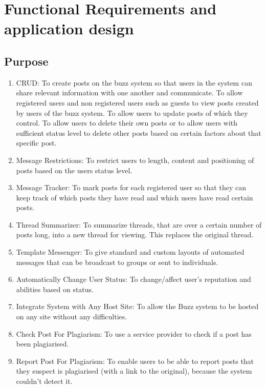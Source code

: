 \documentclass[12pt, oneside]{article}
\begin{document}
\section{Functional Requirements and application design}

\subsection{Purpose}
\begin{enumerate}
 \item{CRUD}: To create posts on the buzz system so that users in the system can share relevant information with one another and communicate. To allow registered users and non registered users such as guests to view posts created by users of the buzz system. To allow users to update posts of which they control. To allow users to delete their own posts or to allow users with sufficient status level to delete other posts based on certain factors about that specific post.
 \\
\item{Message Restrictions}: To restrict users to length, content and positioning of posts based on the users status level. 
\\
 \item{Message Tracker}: To mark posts for each registered user so that they can keep track of which posts they have read and which users have read certain posts.
\\
 \item{Thread Summarizer}: To summarize threads, that are over a certain number of posts long, into a new thread for viewing. This replaces the original thread.
\\
 \item{Template Messenger}: To give standard and custom layouts of automated messages that can be broadcast to groups or sent to individuals.
\\
\item{Automatically Change User Status}: To change/affect user's reputation and abilities based on status.
\\
\item{Integrate System with Any Host Site}: To allow the Buzz system to be hosted on any site without any difficulties.
\\ 
\item{Check Post For Plagiarism}: To use a service provider to check if a post has been plagiarised.
\\
\item{Report Post For Plagiarism}: To enable users to be able to report posts that they suspect is plagiarised (with a link to the original), because the system couldn't detect it.

\end{enumerate}
\end{document}
